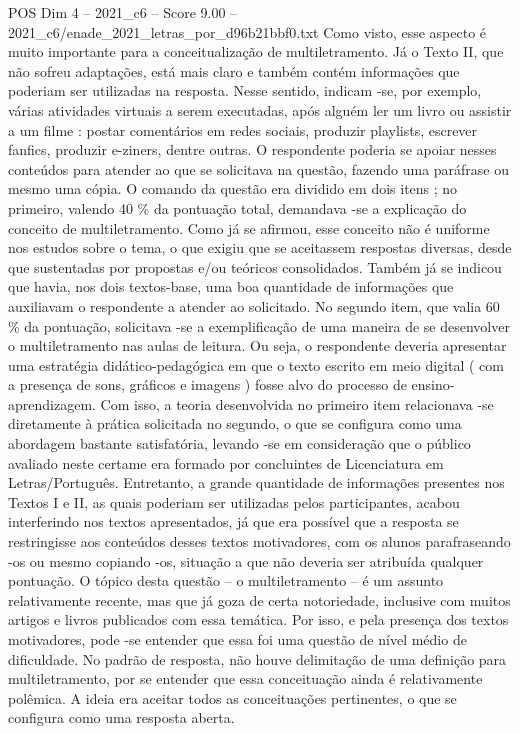 \begin{textsample}{POS Dim 4 – 2021\_c6 – Score 9.00 – 2021\_c6/enade\_2021\_letras\_por\_d96b21bbf0.txt}
Como visto, esse aspecto é muito importante para a conceitualização de multiletramento.
Já o Texto II, que não sofreu adaptações, está mais claro e também contém informações que poderiam ser utilizadas na resposta.
Nesse sentido, indicam -se, por exemplo, várias atividades virtuais a serem executadas, após alguém ler um livro ou assistir a um filme : postar comentários em redes sociais, produzir playlists, escrever fanfics, produzir e-ziners, dentre outras.
O respondente poderia se apoiar nesses conteúdos para atender ao que se solicitava na questão, fazendo uma paráfrase ou mesmo uma cópia.
O comando da questão era dividido em dois itens ; no primeiro, valendo 40 \% da pontuação total, demandava -se a explicação do conceito de multiletramento.
Como já se afirmou, esse conceito não é uniforme nos estudos sobre o tema, o que exigiu que se aceitassem respostas diversas, desde que sustentadas por propostas e/ou teóricos consolidados.
Também já se indicou que havia, nos dois textos-base, uma boa quantidade de informações que auxiliavam o respondente a atender ao solicitado.
No segundo item, que valia 60 \% da pontuação, solicitava -se a exemplificação de uma maneira de se desenvolver o multiletramento nas aulas de leitura.
Ou seja, o respondente deveria apresentar uma estratégia didático-pedagógica em que o texto escrito em meio digital ( com a presença de sons, gráficos e imagens ) fosse alvo do processo de ensino-aprendizagem.
Com isso, a teoria desenvolvida no primeiro item relacionava -se diretamente à prática solicitada no segundo, o que se configura como uma abordagem bastante satisfatória, levando -se em consideração que o público avaliado neste certame era formado por concluintes de Licenciatura em Letras/Português.
Entretanto, a grande quantidade de informações presentes nos Textos I e II, as quais poderiam ser utilizadas pelos participantes, acabou interferindo nos textos apresentados, já que era possível que a resposta se restringisse aos conteúdos desses textos motivadores, com os alunos parafraseando -os ou mesmo copiando -os, situação a que não deveria ser atribuída qualquer pontuação.
O tópico desta questão – o multiletramento – é um assunto relativamente recente, mas que já goza de certa notoriedade, inclusive com muitos artigos e livros publicados com essa temática.
Por isso, e pela presença dos textos motivadores, pode -se entender que essa foi uma questão de nível médio de dificuldade.
No padrão de resposta, não houve delimitação de uma definição para multiletramento, por se entender que essa conceituação ainda é relativamente polêmica.
A ideia era aceitar todos as conceituações pertinentes, o que se configura como uma resposta aberta.

\end{textsample}
